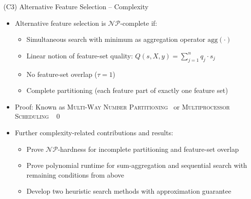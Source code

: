 \documentclass[en, navbarinline, handout]{sdqbeamer}
\begin{document}
\begin{frame}[t]{(C3) Alternative Feature Selection -- Complexity}
	\begin{itemize}
		\item Alternative feature selection is $\mathcal{NP}$-complete if:
		\begin{itemize}
			\item Simultaneous search with minimum as aggregation operator $\text{agg}(\cdot)$
			\item Linear notion of feature-set quality: $Q(s,X,y) = \sum_{j=1}^{n} q_j \cdot s_j$
			\item No feature-set overlap ($\tau = 1$)
			\item Complete partitioning (each feature part of exactly one feature set)
		\end{itemize}
		\pause
		\item Proof: Known as \textsc{Multi-Way Number Partitioning}~\cite{korf2010objective} or \textsc{Multiprocessor Scheduling}~\cite{garey2003computers} \qed
		\pause
		\vspace{\baselineskip}
		\item Further complexity-related contributions and results:
		\begin{itemize}
			\item Prove $\mathcal{NP}$-hardness for incomplete partitioning and feature-set overlap
			\pause
			\item Prove polynomial runtime for sum-aggregation and sequential search with remaining conditions from above
			\pause
			\item Develop two heuristic search methods with approximation guarantee
		\end{itemize}
	\end{itemize}
\end{frame}
\end{document}
